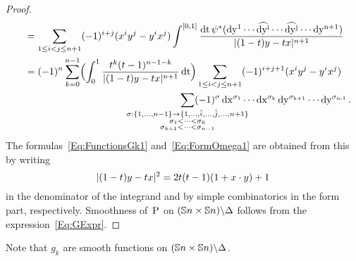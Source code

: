 \documentclass[\MainFolder/Text.tex]{subfiles}
\begin{document}
\begin{proof}
\begin{equation*}
\begin{aligned}
 & \quad = \sum_{1\le i<j \le n+1} (-1)^{i+j}(x^i y^j - y^i x^j) \FInt{[0,1]}  \frac{\Diff{t} \psi^*(\Diff{y^1} \dotsm \widehat{\Diff{y^i}} \dotsm \widehat{\Diff{y^j}} \dotsm \Diff{y^{n+1}})}{\Abs{(1-t)y-tx}^{n+1}} \\ 
 & \quad = \begin{multlined}[t] (-1)^{n}\sum_{k=0}^{n-1} \Bigl(\int_0^1 \frac{t^k(t-1)^{n-1-k}}{\Abs{(1-t)y-tx}^{n+1}} \Diff{t}\Bigr) \sum_{1\le i<j\le n+1} (-1)^{i+j+1} (x^i y^j - y^i x^j) \\
 \sum_{\mathclap{\substack{\sigma: \{1,\dotsc,n-1\}\rightarrow \{1,\dotsc,\hat{i},\dotsc,\hat{j},\dotsc,n+1\} \\ \sigma_1<\dots < \sigma_k \\ \sigma_{k+1}<\dots < \sigma_{n-1}}}} (-1)^\sigma \Diff{x^{\sigma_1}} \dotsm \Diff{x^{\sigma_k}}\Diff{y^{\sigma_{k+1}}} \dotsm \Diff{y^{\sigma_{n-1}}}.\end{multlined}
\end{aligned}
\end{equation*}
The formulas~\eqref{Eq:FunctionsGk1} and~\eqref{Eq:FormOmega1} are obtained from this by writing 
$$ |(1-t)y - tx|^2 = 2t(t-1)(1+x \cdot y) + 1 $$
in the denominator of the integrand and by simple combinatorics in the form part, respectively. Smoothness of~$\mathrm{P}$ on $(\mathbb{S}{n}\times \mathbb{S}{n})\backslash \Delta$ follows from the expression~\eqref{Eq:GExpr}.
\end{proof}
Note that $g_k$ are smooth functions on $(\mathbb{S}{n}\times \mathbb{S}{n})\backslash \Delta$.
%
\end{document}
